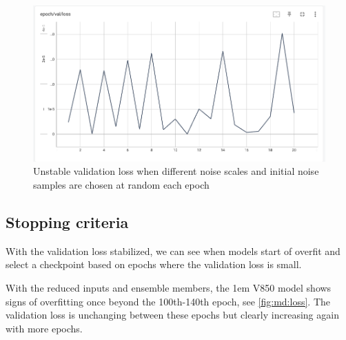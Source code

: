 \begin{figure}
  \centering
  \includegraphics[width=\textwidth]{chapters/figures/3_md/loss/unstable-pr-12em-pslS4T4V4-val-loss.png}
  \caption{Unstable validation loss when different noise scales and initial noise samples are chosen at random each epoch}
  \label{fig:md:unstable-val-loss}
\end{figure}


\subsection{Stopping criteria}

With the validation loss stabilized, we can see when models start of overfit and select a checkpoint based on epochs where the validation loss is small.

With the reduced inputs and ensemble members, the 1em V850 model shows signs of overfitting once beyond the 100th-140th epoch, see \autoref{fig:md:loss}. The validation loss is unchanging between these epochs but clearly increasing again with more epochs.

